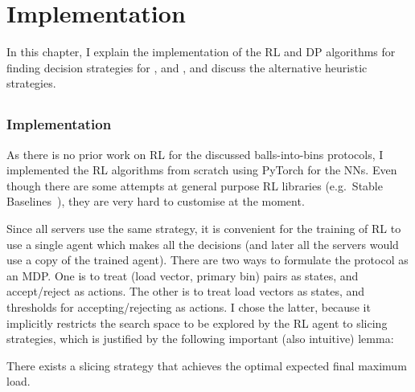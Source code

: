 \chapter{Implementation}\label{implementation}

\ifpdf
    \graphicspath{{Chapter3/Figs/Raster/}{Chapter3/Figs/PDF/}{Chapter3/Figs/}}
\else
    \graphicspath{{Chapter3/Figs/Vector/}{Chapter3/Figs/}}
\fi



In this chapter, I explain the implementation of the RL and DP algorithms for finding decision strategies for \TwoThinning, \KThinning and \GraphicalTwoChoice, and discuss the alternative heuristic strategies.


\section{\TwoThinning}


\subsection{\DQL Implementation} \label{dqn-implmentation-two-thinning}


As there is no prior work on RL for the discussed balls-into-bins protocols, I implemented the RL algorithms from scratch using PyTorch for the NNs. Even though there are some attempts at general purpose RL libraries (e.g.\ Stable Baselines~\cite{hill2018stablebaselines}), they are very hard to customise at the moment.


Since all servers use the same strategy, it is convenient for the training of RL to use a single agent which makes all the decisions (and later all the servers would use a copy of the trained agent). There are two ways to formulate the \TwoThinning protocol as an MDP. One is to treat (load vector, primary bin) pairs as states, and accept/reject as actions. The other is to treat load vectors as states, and thresholds for accepting/rejecting as actions. I chose the latter, because it implicitly restricts the search space to be explored by the RL agent to slicing strategies, which is justified by the following important (also intuitive) lemma:


\begin{lemma}  \label{lemma: thresholdproperty}
There exists a slicing strategy that achieves the optimal expected final maximum load.
\end{lemma}


